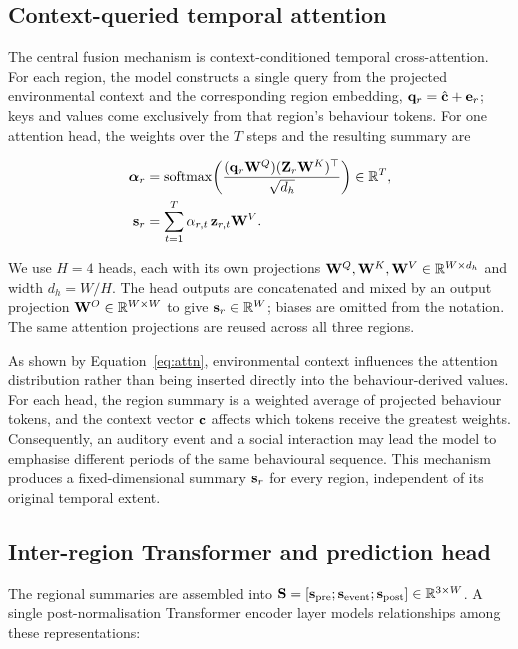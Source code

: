 \subsection{Context-queried temporal attention}
\label{sec:cross-attention}

The central fusion mechanism is context-conditioned temporal cross-attention. For each region, the model constructs a single query from the projected environmental context and the corresponding region embedding, $\mathbf{q}_r = \hat{\mathbf{c}} + \mathbf{e}_r$; keys and values come exclusively from that region's behaviour tokens. For one attention head, the weights over the $T$ steps and the resulting summary are

\begin{equation}
  \begin{aligned}
    \bm{\alpha}_r &= \operatorname{softmax}\!\left(\frac{(\mathbf{q}_r\mathbf{W}^{Q})(\mathbf{Z}_r\mathbf{W}^{K})^{\top}}{\sqrt{d_h}}\right)\in\mathbb{R}^{T},\\
    \mathbf{s}_r &= \sum_{t=1}^{T}\alpha_{r,t}\,\mathbf{z}_{r,t}\mathbf{W}^{V}.
  \end{aligned}
  \label{eq:attn}
\end{equation}

We use $H=4$ heads, each with its own projections $\mathbf{W}^{Q},\mathbf{W}^{K},\mathbf{W}^{V}\in\mathbb{R}^{W\times d_h}$ and width $d_h=W/H$. The head outputs are concatenated and mixed by an output projection $\mathbf{W}^{O}\in\mathbb{R}^{W\times W}$ to give $\mathbf{s}_r\in\mathbb{R}^{W}$; biases are omitted from the notation. The same attention projections are reused across all three regions.

As shown by Equation~\eqref{eq:attn}, environmental context influences the attention distribution rather than being inserted directly into the behaviour-derived values. For each head, the region summary is a weighted average of projected behaviour tokens, and the context vector $\mathbf{c}$ affects which tokens receive the greatest weights. Consequently, an auditory event and a social interaction may lead the model to emphasise different periods of the same behavioural sequence. This mechanism produces a fixed-dimensional summary $\mathbf{s}_r$ for every region, independent of its original temporal extent.

\subsection{Inter-region Transformer and prediction head}
\label{sec:region-transformer}

The regional summaries are assembled into $\mathbf{S}=[\mathbf{s}_{\text{pre}};\mathbf{s}_{\text{event}};\mathbf{s}_{\text{post}}]\in\mathbb{R}^{3\times W}$. A single post-normalisation Transformer encoder layer models relationships among these representations:

